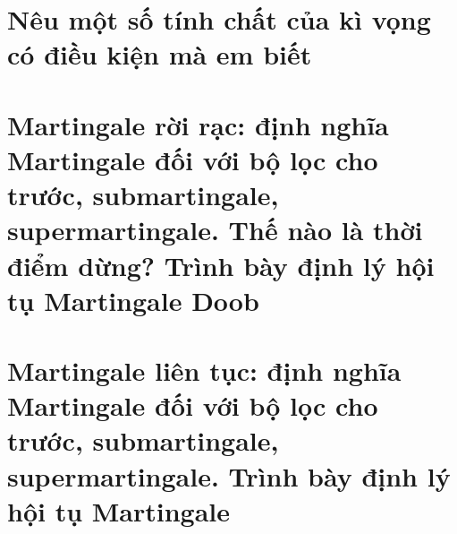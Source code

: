 \documentclass{article}
\begin{document}
\section{Nêu một số tính chất của kì vọng có điều kiện mà em biết}

\section{Martingale rời rạc: định nghĩa Martingale đối với bộ lọc cho trước, submartingale, supermartingale. Thế nào là thời điểm dừng? Trình bày định lý hội tụ Martingale Doob}

\section{Martingale liên tục: định nghĩa Martingale đối với bộ lọc cho trước, submartingale, supermartingale. Trình bày định lý hội tụ Martingale}
\end{document}
